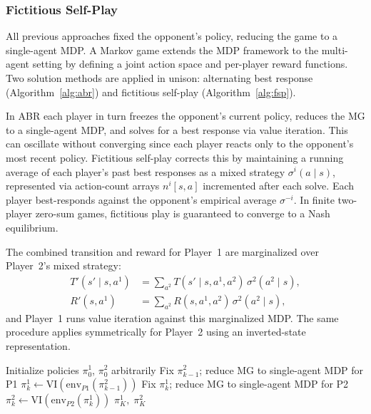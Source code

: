 \documentclass[conference]{IEEEtran}
\begin{document}
\subsubsection{Fictitious Self-Play}

All previous approaches fixed the opponent's policy, reducing the game to a
single-agent MDP. A Markov game extends the MDP framework to the multi-agent setting
by defining a joint action space and per-player reward functions. Two solution methods
are applied in unison: alternating best response (Algorithm~\ref{alg:abr}) and fictitious
self-play (Algorithm~\ref{alg:fsp}).

In ABR each player in turn freezes the opponent's current policy, reduces the MG to a
single-agent MDP, and solves for a best response via value iteration. This can
oscillate without converging since each player reacts only to the opponent's most recent
policy. Fictitious self-play corrects this by maintaining a running average of each
player's past best responses as a mixed strategy $\sigma^i(a\mid s)$, represented via
action-count arrays $n^i[s,a]$ incremented after each solve. Each player best-responds
against the opponent's empirical average $\sigma^{-i}$. In finite two-player zero-sum
games, fictitious play is guaranteed to converge to a Nash equilibrium.

The combined transition and reward for Player~1 are marginalized over Player~2's mixed
strategy:
\begin{align}
  T'(s'\mid s,a^1) &= \sum_{a^2} T(s'\mid s,a^1,a^2)\,\sigma^2(a^2\mid s), \\
  R'(s,a^1)        &= \sum_{a^2} R(s,a^1,a^2)\,\sigma^2(a^2\mid s),
\end{align}
and Player~1 runs value iteration against this marginalized MDP. The same procedure
applies symmetrically for Player~2 using an inverted-state representation.

\begin{algorithm}
\caption{Alternating Best Response \cite{kochenderfer2022algorithms}}
\label{alg:abr}
\begin{algorithmic}[1]
\State Initialize policies $\pi^1_0$, $\pi^2_0$ arbitrarily
  \State Fix $\pi^2_{k-1}$; reduce MG to single-agent MDP for P1
  \State $\pi^1_k \gets \mathrm{VI}\!\left(\mathrm{env}_{P1}(\pi^2_{k-1})\right)$
  \State Fix $\pi^1_k$; reduce MG to single-agent MDP for P2
  \State $\pi^2_k \gets \mathrm{VI}\!\left(\mathrm{env}_{P2}(\pi^1_k)\right)$
\EndFor
\State \Return $\pi^1_K,\; \pi^2_K$
\end{algorithmic}
\end{algorithm}
\end{document}
